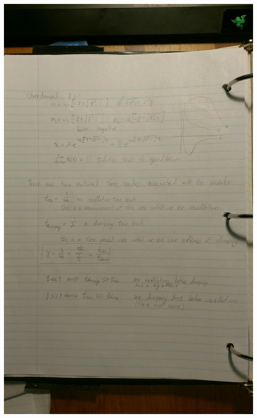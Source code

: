 \documentclass[11pt]{article}
\theoremstyle{definition}
\begin{document}
\includegraphics[width=\textwidth,height=\textheight,keepaspectratio]{friday/5.jpg}\\
\end{document}
